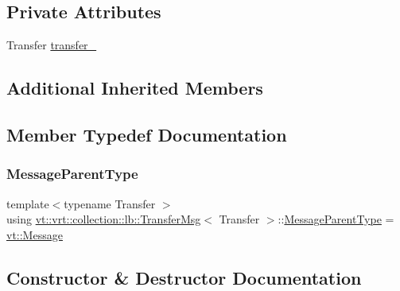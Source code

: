 \subsection*{Private Attributes}
\begin{DoxyCompactItemize}
\item 
Transfer \hyperlink{structvt_1_1vrt_1_1collection_1_1lb_1_1_transfer_msg_ab8a2aefc116dd5d0fc06e6aa722ce0ef}{transfer\+\_\+}
\end{DoxyCompactItemize}
\subsection*{Additional Inherited Members}


\subsection{Member Typedef Documentation}
\mbox{\label{structvt_1_1vrt_1_1collection_1_1lb_1_1_transfer_msg_a7bbde6f5de84e4616188963323d473ca}} 
\subsubsection{\texorpdfstring{Message\+Parent\+Type}{MessageParentType}}
{\footnotesize\ttfamily template$<$typename Transfer $>$ \\
using \hyperlink{structvt_1_1vrt_1_1collection_1_1lb_1_1_transfer_msg}{vt\+::vrt\+::collection\+::lb\+::\+Transfer\+Msg}$<$ Transfer $>$\+::\hyperlink{structvt_1_1messaging_1_1_active_msg_ac2e6d93267991027ce78c968b17064c7}{Message\+Parent\+Type} =  \hyperlink{namespacevt_a3a3ddfef40b4c90915fa43cdd5f129ea}{vt\+::\+Message}}



\subsection{Constructor \& Destructor Documentation}
\mbox{\label{structvt_1_1vrt_1_1collection_1_1lb_1_1_transfer_msg_ad94fef4d81e901de07019aa41718c516}} 
